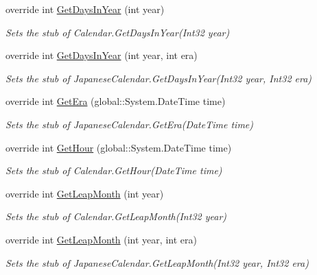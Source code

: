 \begin{DoxyCompactItemize}
override int \hyperlink{class_system_1_1_globalization_1_1_fakes_1_1_stub_japanese_calendar_aa2e7ad3325a4f1e6881b4154cfac6d8f}{Get\-Days\-In\-Year} (int year)
\begin{DoxyCompactList}\small\item\em Sets the stub of Calendar.\-Get\-Days\-In\-Year(\-Int32 year)\end{DoxyCompactList}\item 
override int \hyperlink{class_system_1_1_globalization_1_1_fakes_1_1_stub_japanese_calendar_abf06ad97a42ad2e404760da1554d2e79}{Get\-Days\-In\-Year} (int year, int era)
\begin{DoxyCompactList}\small\item\em Sets the stub of Japanese\-Calendar.\-Get\-Days\-In\-Year(\-Int32 year, Int32 era)\end{DoxyCompactList}\item 
override int \hyperlink{class_system_1_1_globalization_1_1_fakes_1_1_stub_japanese_calendar_ace3dd147a1b3065bd4c5b69476c19052}{Get\-Era} (global\-::\-System.\-Date\-Time time)
\begin{DoxyCompactList}\small\item\em Sets the stub of Japanese\-Calendar.\-Get\-Era(\-Date\-Time time)\end{DoxyCompactList}\item 
override int \hyperlink{class_system_1_1_globalization_1_1_fakes_1_1_stub_japanese_calendar_ae7af85b6e1971d57e2c1239701d5aae4}{Get\-Hour} (global\-::\-System.\-Date\-Time time)
\begin{DoxyCompactList}\small\item\em Sets the stub of Calendar.\-Get\-Hour(\-Date\-Time time)\end{DoxyCompactList}\item 
override int \hyperlink{class_system_1_1_globalization_1_1_fakes_1_1_stub_japanese_calendar_aec6a183b647e852ccad8b8bb548865f9}{Get\-Leap\-Month} (int year)
\begin{DoxyCompactList}\small\item\em Sets the stub of Calendar.\-Get\-Leap\-Month(\-Int32 year)\end{DoxyCompactList}\item 
override int \hyperlink{class_system_1_1_globalization_1_1_fakes_1_1_stub_japanese_calendar_a53b805088127979e21e94f3db4843086}{Get\-Leap\-Month} (int year, int era)
\begin{DoxyCompactList}\small\item\em Sets the stub of Japanese\-Calendar.\-Get\-Leap\-Month(\-Int32 year, Int32 era)\end{DoxyCompactList}\item 

\end{DoxyCompactItemize}

